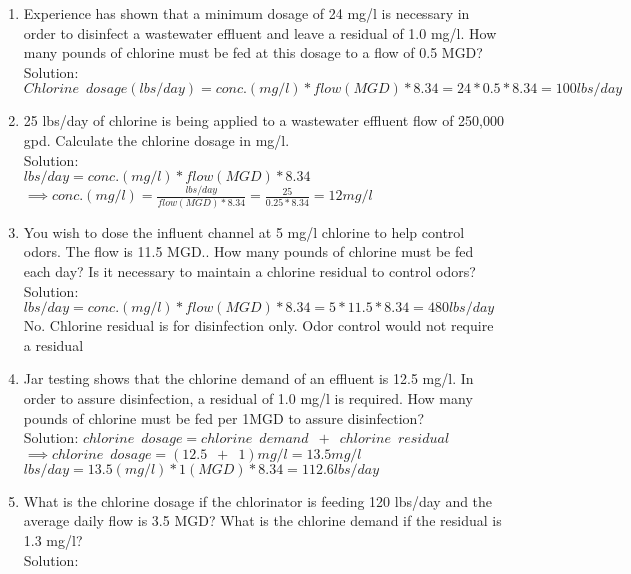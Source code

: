 \begin{enumerate}
\item Experience has shown that a minimum dosage of 24 mg/l is necessary in order to disinfect a wastewater effluent and leave a residual of 1.0 mg/l. How many pounds of chlorine must be fed at this dosage to a flow of 0.5 MGD?\\
Solution:\\
$Chlorine \enspace dosage (lbs/day)=conc. (mg/l)*flow(MGD)*8.34=24*0.5*8.34=\boxed{100lbs/day}$\\
\vspace{0.25cm}
\item 25 lbs/day of chlorine is being applied to a wastewater effluent flow of 250,000 gpd. Calculate the chlorine dosage in mg/l.\\
Solution:\\
$lbs/day=conc. (mg/l)*flow(MGD)*8.34$\\
$\implies conc. (mg/l)=\frac{lbs/day}{flow(MGD)*8.34}=\frac{25}{0.25*8.34}=\boxed{12mg/l}$
\vspace{0.25cm}
\item You wish to dose the influent channel at 5 mg/l chlorine to help control odors. The flow is 11.5 MGD.. How many pounds of chlorine must be fed each day? Is it necessary to maintain a chlorine residual to control odors?\\
Solution:\\
$lbs/day=conc. (mg/l)*flow(MGD)*8.34=5*11.5*8.34=\boxed{480lbs/day}$\\
No.  Chlorine residual is for disinfection only.  Odor control would not require a residual\\
\item Jar testing shows that the chlorine demand of an effluent is 12.5 mg/l. In order to assure disinfection, a residual of 1.0 mg/l is required. How many pounds of chlorine must be fed per 1MGD to assure disinfection?\\
Solution: 
$ chlorine \enspace dosage = chlorine \enspace demand \enspace + \enspace chlorine \enspace residual$\\
$\implies chlorine \enspace dosage = (12.5 \enspace + \enspace 1 )mg/l=13.5 mg/l$\\
$lbs/day=13.5(mg/l)*1(MGD)*8.34=\boxed{112.6 lbs/day}$
\item What is the chlorine dosage if the chlorinator is feeding 120 lbs/day and the average daily flow is 3.5 MGD?  What is the chlorine demand if the residual is 1.3 mg/l?\\
\vspace{0.25cm}
Solution:\\

\end{enumerate}
